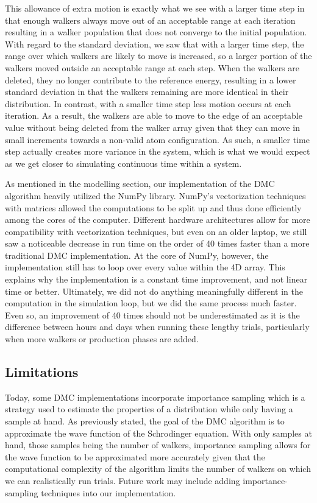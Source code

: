 \documentclass[journal=jacsat,manuscript=article]{achemso}
\begin{document}
This allowance of extra motion is exactly what we see with a larger time step in that enough walkers always move out of an acceptable range at each iteration resulting in a walker population that does not converge to the initial population. With regard to the standard deviation, we saw that with a larger time step, the range over which walkers are likely to move is increased, so a larger portion of the walkers moved outside an acceptable range at each step. When the walkers are deleted, they no longer contribute to the reference energy, resulting in a lower standard deviation in that the walkers remaining are more identical in their distribution. In contrast, with a smaller time step less motion occurs at each iteration. As a result, the walkers are able to move to the edge of an acceptable value without being deleted from the walker array given that they can move in small increments towards a non-valid atom configuration. As such, a smaller time step actually creates more variance in the system, which is what we would expect as we get closer to simulating continuous time within a system. 

As mentioned in the modelling section, our implementation of the DMC algorithm heavily utilized the NumPy library. NumPy’s vectorization techniques with matrices allowed the computations to be split up and thus done efficiently among the cores of the computer. Different hardware architectures allow for more compatibility with vectorization techniques, but even on an older laptop, we still saw a noticeable decrease in run time on the order of 40 times faster than a more traditional DMC implementation. At the core of NumPy, however, the implementation still has to loop over every value within the 4D array. This explains why the implementation is a constant time improvement, and not linear time or better. Ultimately, we did not do anything meaningfully different in the computation in the simulation loop, but we did the same process much faster. Even so, an improvement of 40 times should not be underestimated as it is the difference between hours and days when running these lengthy trials, particularly when more walkers or production phases are added.

\subsection{Limitations}

Today, some DMC implementations incorporate importance sampling\cite{Vihola2020} which is a strategy used to estimate the properties of a distribution while only having a sample at hand. As previously stated, the goal of the DMC algorithm is to approximate the wave function of the Schrodinger equation. With only samples at hand, those samples being the number of walkers, importance sampling allows for the wave function to be approximated more accurately\cite{Bulik2018} given that the computational complexity of the algorithm limits the number of walkers on which we can realistically run trials. Future work may include adding importance-sampling techniques into our implementation. 
\end{document}
